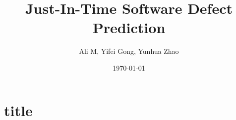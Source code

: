 \documentclass{article}
\title{Just-In-Time Software Defect Prediction}
\author{Ali M, Yifei Gong, Yunhua Zhao}
\date{\today}
\begin{document}
\maketitle

\section{title}
\end{document}
